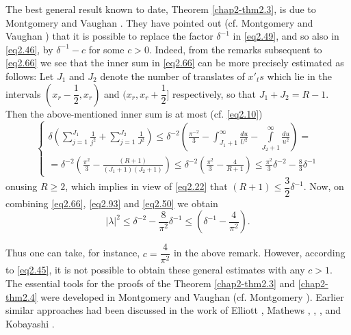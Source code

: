 The best general result known to date, Theorem \ref{chap2-thm2.3}, is due to
Montgomery and Vaughan \cite{key2}. They have pointed out (cf. Montgomery
and Vaughan \cite{key1}) that it is possible to replace the factor
$\delta^{-1}$ in \eqref{eq2.49}, and so also in \eqref{eq2.46}, by
$\delta^{-1}-c$ 
for some $c>0$. Indeed, from the remarks subsequent to \eqref{eq2.66} we see
that the inner sum in \eqref{eq2.66} can be more precisely estimated as
follows: Let $J_1$ and $J_2$ denote the number of translates of
$x'_ts$ which lie in the intervals $(x_r-\dfrac{1}{2},x_r)$ and $(x_r,
x_r+\dfrac{1}{2}]$ respectively, so that $J_1 + J_2=R-1$. Then the
above-mentioned inner sum is at most (cf. \eqref{eq2.10}) 
\begin{equation*}
\begin{cases}
\delta(\sum\limits^{J_1}_{j=1} \frac{1}{j^2} + \sum\limits^{J_2}_{j=1}
\frac{1}{J^2})
\leq \delta^{-2} (\frac{\pi^{-2}}{3}- \int^{\infty}_{J_1+1}
\frac{du}{U^2}- \int \limits_{J_2+1}^{\infty} \frac{du}{u^2})=\\ 
=\delta^{-2}(\frac{\pi^2}{3}- \frac{(R+1)}{(J_1+1)(J_2+1)})
\leq\delta^{-2}(\frac{\pi^2}{3}-\frac{4}{{R+1}}) \leq \frac{\pi^2}{3}
\delta^{-2}-\frac{8}{3}\delta^{-1} 
\end{cases} \tag{2.93}\label{eq2.93}
\end{equation*}	
on\pageoriginale using $R \geq 2$, which implies in view of
\eqref{eq2.22} that $(R+1)\leq \dfrac{3}{2}\delta^{-1}$. Now, on
combining \eqref{eq2.66}, \eqref{eq2.93} and \eqref{eq2.50} we obtain  
\begin{equation*}
|\lambda|^2 \leq \delta^{-2}-\frac{8}{\pi^2}\delta^{-1} \leq (\delta^{-1}-\frac{4}{\pi^2}). \tag{2.94}\label{eq2.94}
\end{equation*}

Thus one can take, for instance, $c=\dfrac{4}{\pi^2}$ in the above
remark. However, according to \eqref{eq2.45}, it is not possible to obtain
these general estimates with any $c>1$. The essential tools for the
proofs of the Theorem \ref{chap2-thm2.3} and \ref{chap2-thm2.4} were
developed in Montgomery and 
Vaughan \cite{key1} (cf. Montgomery \cite{key6}). Earlier similar approaches had
been discussed in the work of Elliott \cite{key7}, Mathews
\cite{key1}, \cite{key2}, \cite{key3},
and Kobayashi \cite{key1}. 

